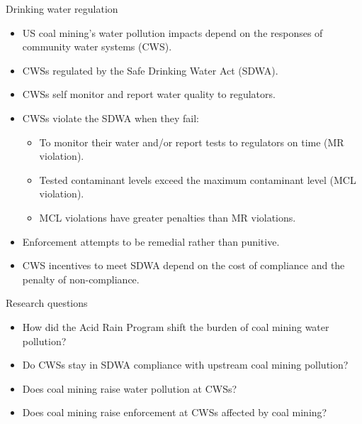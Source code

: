 \documentclass{beamer}
\begin{document}
\begin{frame}{Drinking water regulation}
    \begin{itemize}
        \item US coal mining's water pollution impacts depend on the responses of community water systems (CWS).
        \item CWSs regulated by the Safe Drinking Water Act (SDWA).
        \item CWSs self monitor and report water quality to regulators.
        \item CWSs violate the SDWA when they fail:
        \begin{itemize}
            \item To monitor their water and/or report tests to regulators on time (MR violation).
            \item Tested contaminant levels exceed the maximum contaminant level (MCL violation).
            \item MCL violations have greater penalties than MR violations.
        \end{itemize}
        \item Enforcement attempts to be remedial rather than punitive.
        \item CWS incentives to meet SDWA depend on the cost of compliance and the penalty of non-compliance.
    \end{itemize}
\end{frame}

\begin{frame}{Research questions}  
    \begin{itemize}
        \item How did the Acid Rain Program shift the burden of coal mining water pollution?
        \item Do CWSs stay in SDWA compliance with upstream coal mining pollution?
        \item Does coal mining raise water pollution at CWSs?
        \item Does coal mining raise enforcement at CWSs affected by coal mining?
    \end{itemize}
\end{frame}
\end{document}
